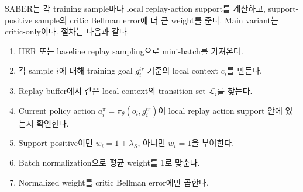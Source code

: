 \documentclass[letterpaper]{article}
\begin{document}
SABER는 각 training sample마다 local replay-action support를 계산하고, support-positive sample의 critic Bellman error에 더 큰 weight를 준다. Main variant는 critic-only이다. 절차는 다음과 같다.
\begin{enumerate}
    \item HER 또는 baseline replay sampling으로 mini-batch를 가져온다.
    \item 각 sample \(i\)에 대해 training goal \(g_i^{tr}\) 기준의 local context \(c_i\)를 만든다.
    \item Replay buffer에서 같은 local context의 transition set \(\mathcal L_i\)를 찾는다.
    \item Current policy action \(a_i^\pi=\pi_\theta(o_i,g_i^{tr})\)이 local replay action support 안에 있는지 확인한다.
    \item Support-positive이면 \(w_i=1+\lambda_S\), 아니면 \(w_i=1\)을 부여한다.
    \item Batch normalization으로 평균 weight를 1로 맞춘다.
    \item Normalized weight를 critic Bellman error에만 곱한다.
\end{enumerate}
\end{document}
